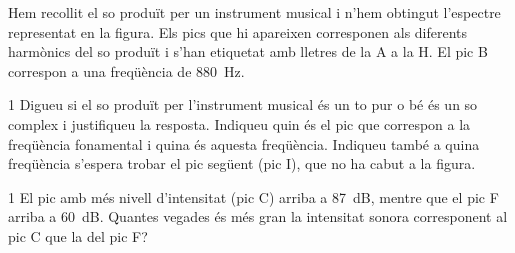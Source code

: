 Hem recollit el so produït per un instrument musical i n'hem obtingut l'espectre representat en la figura. Els pics que hi apareixen corresponen als diferents harmònics del so produït i s'han etiquetat amb lletres de la A a la H. El pic B correspon a una freqüència de 880~Hz.


\begin{apartat}{1}
Digueu si el so produït per l'instrument musical és un to pur o bé és un so complex i justifiqueu la resposta. Indiqueu quin és el pic que correspon a la freqüència fonamental i quina és aquesta freqüència. Indiqueu també a quina freqüència s'espera trobar el pic següent (pic I), que no ha cabut a la figura.
\end{apartat}

\begin{apartat}{1}
El pic amb més nivell d'intensitat (pic C) arriba a 87~dB, mentre que el pic F arriba a 60~dB. Quantes vegades és més gran la intensitat sonora corresponent al pic C que la del pic F?
\end{apartat}
